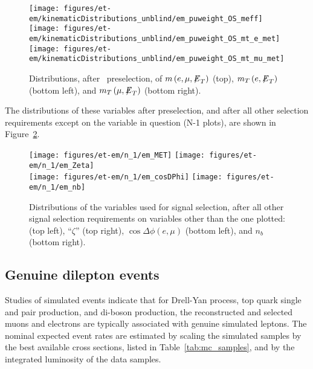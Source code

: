 \begin{figure}[thbp!]\centering
  \texttt{[image: figures/et-em/kinematicDistributions\_unblind/em\_puweight\_OS\_meff]} \\
  \texttt{[image: figures/et-em/kinematicDistributions\_unblind/em\_puweight\_OS\_mt\_e\_met]}
  \texttt{[image: figures/et-em/kinematicDistributions\_unblind/em\_puweight\_OS\_mt\_mu\_met]}
  \caption{\label{fig:em_preselection_distributions3} Distributions,
    after \tetm ~preselection, of $m\left(e, \mu, {\not\mathrel{E}}_T\right)$
    (top), $m_{T}\left(e, {\not\mathrel{E}}_T\right)$ (bottom left), and
    $m_{T}\left(\mu, {\not\mathrel{E}}_T\right)$ (bottom right).}
\end{figure}

The distributions of these variables after preselection, and after
all other selection requirements except on the variable in question (N-1 plots), are shown in
Figure~\ref{fig:em_nm1_distributions}.

\begin{figure}[thbp!]\centering
  \texttt{[image: figures/et-em/n\_1/em\_MET]}
  \texttt{[image: figures/et-em/n\_1/em\_Zeta]} \\
  \texttt{[image: figures/et-em/n\_1/em\_cosDPhi]}
  \texttt{[image: figures/et-em/n\_1/em\_nb]}
  \caption{\label{fig:em_nm1_distributions} Distributions of the
    variables used for \tetm signal selection, after all other signal
    selection requirements on variables other than the one plotted:
    \ETslash (top left), ``$\zeta$'' (top right), $\cos{\Delta \phi
      (e,\mu)}$ (bottom left), and $n_b$ (bottom right).}
\end{figure}

\subsection{Genuine dilepton events}
Studies of simulated events indicate that for Drell-Yan process, top
quark single and pair production, and di-boson production, the
reconstructed and selected muons and electrons are typically
associated with genuine simulated leptons.  The nominal expected event
rates are estimated by scaling the simulated samples by the best
available cross sections, listed in Table~\ref{tab:mc_samples}, and by
the integrated luminosity of the data samples.

